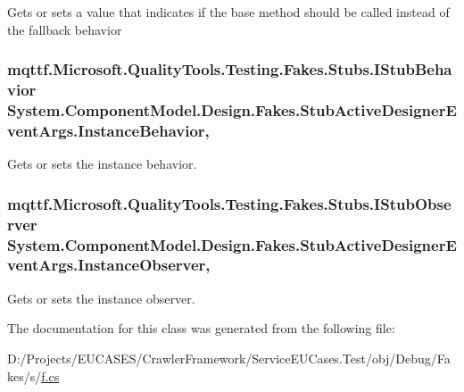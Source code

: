 Gets or sets a value that indicates if the base method should be called instead of the fallback behavior

\hypertarget{class_system_1_1_component_model_1_1_design_1_1_fakes_1_1_stub_active_designer_event_args_a7bae42978505cbc127942b017944e3a0}{
\subsubsection[{Instance\-Behavior}]{\setlength{\rightskip}{0pt plus 5cm}mqttf.\-Microsoft.\-Quality\-Tools.\-Testing.\-Fakes.\-Stubs.\-I\-Stub\-Behavior System.\-Component\-Model.\-Design.\-Fakes.\-Stub\-Active\-Designer\-Event\-Args.\-Instance\-Behavior\hspace{0.3cm}{\ttfamily [get]}, {\ttfamily [set]}}}\label{class_system_1_1_component_model_1_1_design_1_1_fakes_1_1_stub_active_designer_event_args_a7bae42978505cbc127942b017944e3a0}


Gets or sets the instance behavior.

\hypertarget{class_system_1_1_component_model_1_1_design_1_1_fakes_1_1_stub_active_designer_event_args_a96b6a4691bfe6d1fbbd511fc803737bc}{
\subsubsection[{Instance\-Observer}]{\setlength{\rightskip}{0pt plus 5cm}mqttf.\-Microsoft.\-Quality\-Tools.\-Testing.\-Fakes.\-Stubs.\-I\-Stub\-Observer System.\-Component\-Model.\-Design.\-Fakes.\-Stub\-Active\-Designer\-Event\-Args.\-Instance\-Observer\hspace{0.3cm}{\ttfamily [get]}, {\ttfamily [set]}}}\label{class_system_1_1_component_model_1_1_design_1_1_fakes_1_1_stub_active_designer_event_args_a96b6a4691bfe6d1fbbd511fc803737bc}


Gets or sets the instance observer.



The documentation for this class was generated from the following file\-:\begin{DoxyCompactItemize}
\item 
D\-:/\-Projects/\-E\-U\-C\-A\-S\-E\-S/\-Crawler\-Framework/\-Service\-E\-U\-Cases.\-Test/obj/\-Debug/\-Fakes/s/\hyperlink{s_2f_8cs}{f.\-cs}\end{DoxyCompactItemize}
